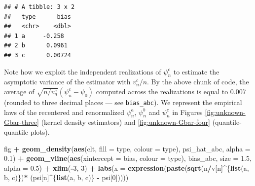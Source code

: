 \documentclass[]{article}
\newenvironment{Shaded}{\begin{snugshade}}{\end{snugshade}}
\newcommand{\DataTypeTok}[1]{\textcolor[rgb]{0.13,0.29,0.53}{#1}}
\newcommand{\DecValTok}[1]{\textcolor[rgb]{0.00,0.00,0.81}{#1}}
\newcommand{\FloatTok}[1]{\textcolor[rgb]{0.00,0.00,0.81}{#1}}
\newcommand{\KeywordTok}[1]{\textcolor[rgb]{0.13,0.29,0.53}{\textbf{#1}}}
\newcommand{\NormalTok}[1]{#1}
\newcommand{\OperatorTok}[1]{\textcolor[rgb]{0.81,0.36,0.00}{\textbf{#1}}}
\newcommand{\StringTok}[1]{\textcolor[rgb]{0.31,0.60,0.02}{#1}}
\theoremstyle{definition}
\theoremstyle{definition}
\theoremstyle{definition}
\theoremstyle{remark}
\begin{document}
\begin{verbatim}
## # A tibble: 3 x 2
##   type      bias
##   <chr>    <dbl>
## 1 a     -0.258  
## 2 b      0.0961 
## 3 c      0.00724
\end{verbatim}

Note how we exploit the independent realizations of \(\psi_{n}^{c}\) to
estimate the asymptotic variance of the estimator with \(v_{n}^{c}/n\).
By the above chunk of code, the average of
\(\sqrt{n/v_{n}^{c}} (\psi_{n}^{c} - \psi_{0})\) computed across the
realizations is equal to 0.007 (rounded to three decimal places --- see
\texttt{bias\_abc}). We represent the empirical laws of the recentered
and renormalized \(\psi_{n}^{a}\), \(\psi_{n}^{b}\) and \(\psi_{n}^{c}\)
in Figures \ref{fig:unknown-Gbar-three} (kernel density estimators) and
\ref{fig:unknown-Gbar-four} (quantile-quantile plots).

\begin{Shaded}
\begin{Highlighting}[]
\NormalTok{fig }\OperatorTok{+}
\StringTok{  }\KeywordTok{geom_density}\NormalTok{(}\KeywordTok{aes}\NormalTok{(clt, }\DataTypeTok{fill =}\NormalTok{ type, }\DataTypeTok{colour =}\NormalTok{ type), psi_hat_abc, }\DataTypeTok{alpha =} \FloatTok{0.1}\NormalTok{) }\OperatorTok{+}
\StringTok{  }\KeywordTok{geom_vline}\NormalTok{(}\KeywordTok{aes}\NormalTok{(}\DataTypeTok{xintercept =}\NormalTok{ bias, }\DataTypeTok{colour =}\NormalTok{ type),}
\NormalTok{             bias_abc, }\DataTypeTok{size =} \FloatTok{1.5}\NormalTok{, }\DataTypeTok{alpha =} \FloatTok{0.5}\NormalTok{) }\OperatorTok{+}
\StringTok{  }\KeywordTok{xlim}\NormalTok{(}\OperatorTok{-}\DecValTok{3}\NormalTok{, }\DecValTok{3}\NormalTok{) }\OperatorTok{+}\StringTok{ }
\StringTok{  }\KeywordTok{labs}\NormalTok{(}\DataTypeTok{x =} \KeywordTok{expression}\NormalTok{(}\KeywordTok{paste}\NormalTok{(}\KeywordTok{sqrt}\NormalTok{(n}\OperatorTok{/}\NormalTok{v[n]}\OperatorTok{^}\NormalTok{\{}\KeywordTok{list}\NormalTok{(a, b, c)\})}\OperatorTok{*}
\StringTok{                            }\NormalTok{(psi[n]}\OperatorTok{^}\NormalTok{\{}\KeywordTok{list}\NormalTok{(a, b, c)\} }\OperatorTok{-}\StringTok{ }\NormalTok{psi[}\DecValTok{0}\NormalTok{]))))}
\end{Highlighting}
\end{Shaded}
\end{document}
